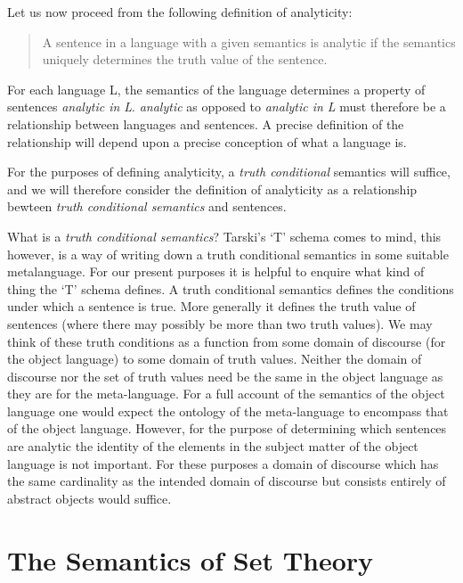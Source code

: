 \documentclass{rbjk}
\begin{document}
\begin{article}
Let us now proceed from the following definition of analyticity:

\begin{quote}
A sentence in a language with a given semantics is analytic if the semantics uniquely determines the truth value of the sentence.
\end{quote}

For each language L, the semantics of the language determines a property of sentences {\it analytic in L}.
{\it analytic} as opposed to {\it analytic in L} must therefore be a relationship between languages and sentences.
A precise definition of the relationship will depend upon a precise conception of what a language is.

For the purposes of defining analyticity, a {\it truth conditional} semantics will suffice, and we will therefore consider the definition of analyticity as a relationship bewteen {\it truth conditional semantics} and sentences.

What is a {\it truth conditional semantics}?
Tarski's `T' schema comes to mind, this however, is a way of writing down a truth conditional semantics in some suitable metalanguage.
For our present purposes it is helpful to enquire what kind of thing the `T' schema defines. 
A truth conditional semantics defines the conditions under which a sentence is true.
More generally it defines the truth value of sentences (where there may possibly be more than two truth values).
We may think of these truth conditions as a function from some domain of discourse (for the object language) to some domain of truth values.
Neither the domain of discourse nor the set of truth values need be the same in the object language as they are for the meta-language.
For a full account of the semantics of the object language one would expect the ontology of the meta-language to encompass that of the object language.
However, for the purpose of determining which sentences are analytic the identity of the elements in the subject matter of the object language is not important.
For these purposes a domain of discourse which has the same cardinality as the intended domain of discourse but consists entirely of abstract objects would suffice.





\section{The Semantics of Set Theory}


\end{article}
\end{document}

